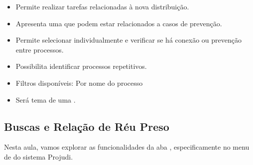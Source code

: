 \documentclass[letterpaper,10pt,brazil]{sphinxmanual}
\begin{document}
\begin{description}
\begin{itemize}
\item {} 
\sphinxAtStartPar
Permite realizar tarefas relacionadas à nova distribuição.

\end{itemize}

\begin{itemize}
\item {} 
\sphinxAtStartPar
Apresenta uma  que podem estar relacionados a casos de prevenção.

\item {} 
\sphinxAtStartPar
Permite selecionar individualmente e verificar se há conexão ou prevenção entre processos.

\end{itemize}

\begin{itemize}
\item {} 
\sphinxAtStartPar
Possibilita identificar processos repetitivos.

\item {} 
\sphinxAtStartPar
Filtros disponíveis:
\sphinxhyphen{} Por nome do processo
\sphinxhyphen{} 
\sphinxhyphen{} 
\sphinxhyphen{} 

\end{itemize}

\begin{itemize}
\item {} 
\sphinxAtStartPar
Será tema de uma .

\end{itemize}

\end{description}

\sphinxstepscope


\subsection{Buscas e Relação de Réu Preso}
\label{\detokenize{projud_43_buscarelacaoreupreso:buscas-e-relacao-de-reu-preso}}\label{\detokenize{projud_43_buscarelacaoreupreso::doc}}
\sphinxAtStartPar
Nesta aula, vamos explorar as funcionalidades da aba , especificamente no menu de  do sistema Projudi.
\end{document}
